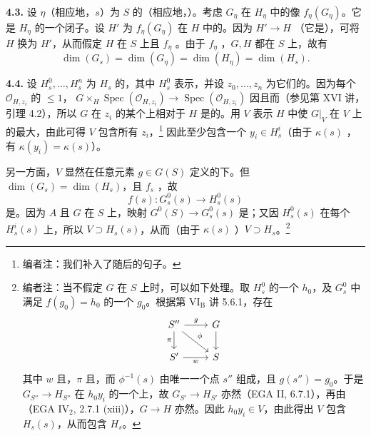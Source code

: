 \textbf{4.3.} 设 $\eta$（相应地，$s$）为 $S$ 的（相应地，）。考虑 $G_\eta$ 在 $H_\eta$ 中的像 $f_\eta(G_\eta)$。它是 $H_\eta$ 的一个闭子。设 $H'$ 为 $f_\eta(G_\eta)$ 在 $H$ 中的。因为 $H'\to H$ （它是），可将 $H$ 换为 $H'$，从而假定 $H$ 在 $S$ 上且 $f_\eta$ 。由于 $f_\eta$ ，$G,H$ 都在 $S$ 上，故有
\[\dim(G_s)=\dim(G_\eta)=\dim(H_\eta)=\dim(H_s).\]

\textbf{4.4.} 设 $H_s^0,\ldots,H_s^n$ 为 $H_s$ 的，其中 $H_s^0$ 表示，并设 $z_0,\ldots,z_n$ 为它们的。因为每个 $\mathcal O_{H,z_i}$ 的 $\leq1$， $G\times_H\operatorname{Spec}(\mathcal O_{H,z_i})\to\operatorname{Spec}(\mathcal O_{H,z_i})$ 因且而（参见第 XVI 讲，引理 4.2），所以 $G$ 在 $z_i$ 的某个上相对于 $H$ 是的。用 $V$ 表示 $H$ 中使 $G|_V$ 在 $V$ 上的最大，由此可得 $V$ 包含所有 $z_i$，\footnote{编者注：我们补入了随后的句子。}
因此至少包含一个 $y_i\in H_s^i$（由于 $\kappa(s)$ ，有 $\kappa(y_i)=\kappa(s)$）。

另一方面，$V$ 显然在任意元素 $g\in G(S)$ 定义的下。但 $\dim(G_s)=\dim(H_s)$，且 $f_s$ ，故
\[f(s):G_s^0(s)\longrightarrow H_s^0(s)\]
是。因为 $A$ 且 $G$ 在 $S$ 上，映射 $G^0(S)\to G_s^0(s)$ 是；又因 $H_s^0(s)$ 在每个 $H_s^i(s)$ 上，所以 $V\supset H_s(s)$，从而（由于 $\kappa(s)$ ）$V\supset H_s$。\footnote{编者注：当不假定 $G$ 在 $S$ 上时，可以如下处理。取 $H_s^0$ 的一个 $h_0$，及 $G_s^0$ 中满足 $f(g_0)=h_0$ 的一个 $g_0$。根据第 VI$_{\mathrm B}$ 讲 5.6.1，存在
\[
\begin{tikzcd}[ampersand replacement=\&]
S''\arrow[r,"g"]\arrow[d,"\pi"']\arrow[dr,"\phi"]\&G\arrow[d]\\
S'\arrow[r,"w"']\&S
\end{tikzcd}
\]
其中 $w$ 且，$\pi$ 且，而 $\phi^{-1}(s)$ 由唯一一个点 $s''$ 组成，且 $g(s'')=g_0$。于是 $G_{S''}\to H_{S''}$ 在 $h_0y_i$ 的一个上，故 $G_{S'}\to H_{S'}$ 亦然（EGA II, 6.7.1），再由（EGA IV$_2$, 2.7.1 (xiii)），$G\to H$ 亦然。因此 $h_0y_i\in V$，由此得出 $V$ 包含 $H_s(s)$，从而包含 $H_s$。}

